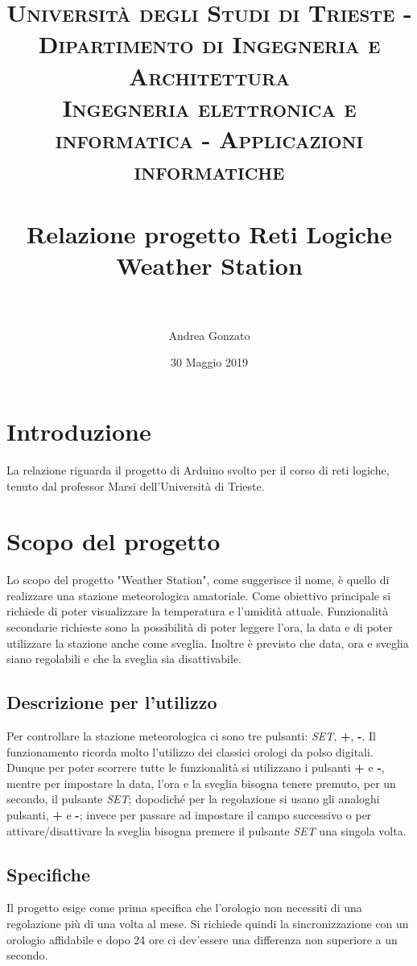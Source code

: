 \documentclass[paper=a4, fontsize=10pt]{scrartcl}
\title{	
\normalfont \normalsize 
\textsc{Universit\`a degli Studi di Trieste - Dipartimento di Ingegneria e Architettura \\ Ingegneria elettronica e informatica - Applicazioni informatiche} \\ [25pt] %
\horrule{0.5pt} \\[0.4cm] %
\huge \textbf{Relazione progetto Reti Logiche\\ Weather Station}  \\ %
\horrule{2pt} \\[0.5cm] %
}
\author{Andrea Gonzato} %
\date{\normalsize 30 Maggio 2019} %
\begin{document}
\maketitle %

\pagebreak

\tableofcontents

\pagebreak

\section{Introduzione}
La relazione riguarda il progetto di Arduino svolto per il corso di reti logiche, tenuto dal professor Marsi dell'Università di Trieste.

\section{Scopo del progetto}
Lo scopo del progetto "Weather Station", come suggerisce il nome, è quello di realizzare una stazione meteorologica amatoriale. Come obiettivo principale si richiede di poter visualizzare la temperatura e l'umidità attuale. Funzionalità secondarie richieste sono la possibilità di poter leggere l'ora, la data e di poter utilizzare la stazione anche come sveglia. Inoltre è previsto che data, ora e sveglia siano regolabili e che la sveglia sia disattivabile.

\subsection{Descrizione per l'utilizzo}
Per controllare la stazione meteorologica ci sono tre pulsanti: \textit{SET}, \textbf{+}, \textbf{-}.
Il funzionamento ricorda molto l'utilizzo dei classici orologi da polso digitali. Dunque per poter scorrere tutte le funzionalità si utilizzano i pulsanti \textbf{+} e \textbf{-}, mentre per impostare la data, l'ora e la sveglia bisogna tenere premuto, per un secondo, il pulsante \textit{SET}; dopodiché per la regolazione si usano gli analoghi pulsanti,  \textbf{+} e \textbf{-}; invece per passare ad impostare il campo successivo o per attivare/disattivare la sveglia bisogna premere il pulsante \textit{SET} una singola volta.


\subsection{Specifiche}
Il progetto esige come prima specifica che l'orologio non necessiti di una regolazione più di una volta al mese. 
Si richiede quindi la sincronizzazione con un orologio affidabile e dopo 24 ore ci dev'essere una differenza non superiore a un secondo.
\end{document}
